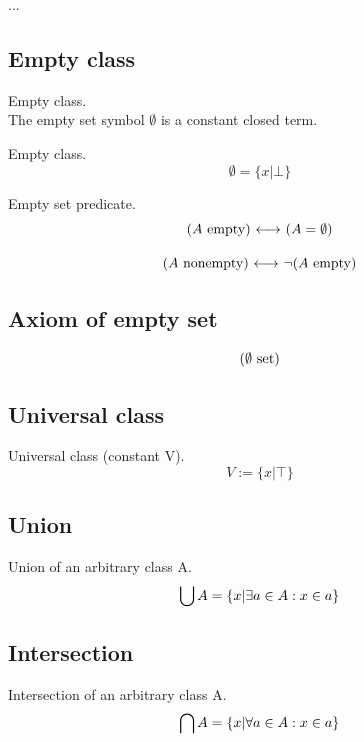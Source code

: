 ...\\
\Done

\subsection{Empty class}
\begin{constructor} Empty class.\\
The empty set symbol $\emptyset$ is a constant closed term.
\end{constructor}
\begin{definition}
\label{def:empty class}
Empty class.
\[
\emptyset = \{x|\bot\}
\]
\end{definition}

\begin{definition} Empty set predicate.
\label{def:empty}
\[
(A\mathrm{\ empty}){\ \longleftrightarrow\ } (A=\emptyset)
\]
\end{definition}

\begin{definition}
\label{def:nonempty}
\[
(A\mathrm{\ nonempty}){\ \longleftrightarrow\ } \neg(A\mathrm{\ empty})
\]
\end{definition}



\subsection{Axiom of empty set}
\begin{axiom}
\label{axm:empty class}
\[
(\emptyset\mathrm{\ set})
\]
\end{axiom}

\subsection{Universal class}
\begin{definition} Universal class (constant V).
\label{def:universal class}
\[
V:=\{x|\top\}
\]
\end{definition}

\subsection{Union}
\begin{definition}
\label{def:union}
Union of an arbitrary class A.
\[
\bigcup A = \{x|\exists a\in A: x\in a\}
\]
\end{definition}


\subsection{Intersection}
\begin{definition}
\label{def:intersection}
Intersection of an arbitrary class A.
\[
\bigcap A = \{x|\forall a\in A: x\in a\}
\]
\end{definition}

